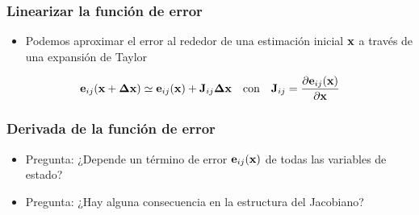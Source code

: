 \begin{frame}
    \frametitle{Linearizar la función de error}
    
    \begin{itemize}
        \item Podemos aproximar el error al rededor de una estimación inicial $\boldsymbol{\mathbf{x}}$ a través de una expansión de Taylor
    \end{itemize}

    \begin{equation*}
        \boldsymbol{\mathbf{e}}_{ij}(\boldsymbol{\mathbf{x}} + \boldsymbol{\mathbf{\Delta}}\boldsymbol{\mathbf{x}}) \simeq  \boldsymbol{\mathbf{e}}_{ij}(\boldsymbol{\mathbf{x}}) + \boldsymbol{\mathbf{J}}_{ij}\boldsymbol{\mathbf{\Delta}}\boldsymbol{\mathbf{x}} \quad \text{con} \quad \boldsymbol{\mathbf{J}}_{ij} = \dfrac{\partial\boldsymbol{\mathbf{e}}_{ij}(\boldsymbol{\mathbf{x}})}{\partial\boldsymbol{\mathbf{x}}}
    \end{equation*}
    
\end{frame}

\begin{frame}
    \frametitle{Derivada de la función de error}
    \begin{itemize}
        \item<1-> Pregunta: ¿Depende un término de error $\boldsymbol{\mathbf{e}}_{ij}(\boldsymbol{\mathbf{x}})$ de todas las variables de estado?
        
        
        \item<3-> Pregunta: ¿Hay alguna consecuencia en la estructura del Jacobiano?
        
        
        
    \end{itemize}
    
\end{frame}


